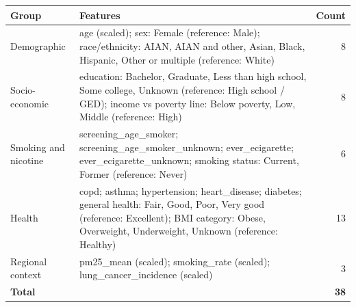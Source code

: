 \begin{tabularx}{\textwidth}{l >{\raggedright\arraybackslash}X r}
\toprule
Group & Features & Count \\
\midrule
Demographic & age (scaled); sex: Female (reference: Male); race/ethnicity: AIAN, AIAN and other, Asian, Black, Hispanic, Other or multiple (reference: White) & 8 \\
Socio-economic & education: Bachelor, Graduate, Less than high school, Some college, Unknown (reference: High school / GED); income vs poverty line: Below poverty, Low, Middle (reference: High) & 8 \\
Smoking and nicotine & screening\_age\_smoker; screening\_age\_smoker\_unknown; ever\_ecigarette; ever\_ecigarette\_unknown; smoking status: Current, Former (reference: Never) & 6 \\
Health & copd; asthma; hypertension; heart\_disease; diabetes; general health: Fair, Good, Poor, Very good (reference: Excellent); BMI category: Obese, Overweight, Underweight, Unknown (reference: Healthy) & 13 \\
Regional context & pm25\_mean (scaled); smoking\_rate (scaled); lung\_cancer\_incidence (scaled) & 3 \\
\midrule
\textbf{Total} &  & \textbf{38} \\
\bottomrule
\end{tabularx}
